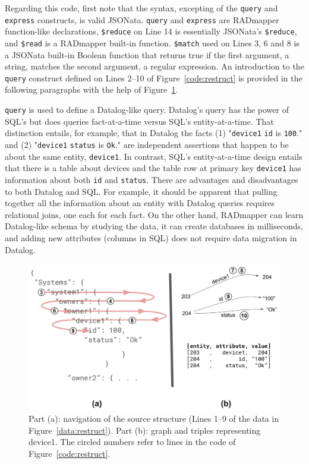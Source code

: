 \documentclass[9pt,letterpaper]{article}
\newcommand{\stt}[1]{\texttt{#1}}
\begin{document}
Regarding this code, first note that the syntax, excepting of the \stt{query} and \stt{express} constructs, is valid JSONata.
\stt{query} and \stt{express} are RADmapper function-like declarations, \stt{\$reduce} on Line 14 is essentially JSONata's \stt{\$reduce}, and \stt{\$read} is a RADmapper built-in function.
\stt{\$match} used on Lines 3, 6 and 8 is a JSONata built-in Boolean function that returns true if the first argument, a string, matches the second argument, a regular expression.
An introduction to the \stt{query} construct defined on Lines 2--10 of Figure~\ref{code:restruct} is provided in the following paragraphs with the help of Figure~\ref{fig:hairpin}.

\stt{query} is used to define a Datalog-like query.
Datalog's query has the power of SQL's but does queries fact-at-a-time versus SQL's entity-at-a-time.
That distinction entails, for example, that in Datalog the facts (1) "\stt{device1} \stt{id} is \stt{100}." and (2) "\stt{device1} \stt{status} is \stt{Ok}." are independent assertions that happen to be about the same entity, \stt{device1}.
In contrast, SQL's entity-at-a-time design entails that there is a table about devices and the table row at primary key \stt{device1} has information about both \stt{id} and \stt{status}.
There are advantages and disadvantages to both Datalog and SQL.\@
For example, it should be apparent that pulling together all the information about an entity with Datalog queries requires relational joins, one each for each fact.
On the other hand, RADmapper can learn Datalog-like schema by studying the data, it can create databases in milliseconds, and adding new attributes (columns in SQL) does not require data migration in Datalog.

\begin{figure}[H]
  \caption{Part (a): navigation of the source structure (Lines 1--9 of the data in Figure~\ref{data:restruct}).
    Part (b): graph and triples representing device1.
    The circled numbers refer to lines in the code of Figure~\ref{code:restruct}.}\label{fig:hairpin}
   \includegraphics[scale=0.15]{hairpin-two-part.jpg}
  \centering
\end{figure}
\end{document}
